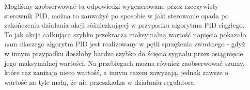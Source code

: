 \documentclass[a4paper, 12pt]{article}
\begin{document}
		\newline
		\newline
		Mogliśmy zaobserwować tu odpowiedzi wygenerowane przez rzeczywisty sterownik PID, można to zauważyć po sposobie w jaki sterowanie opada po zakończeniu działania akcji różniczkującej w przypadku algorytmu PID ciągłego. To jak akcja całkująca szybko przekracza maksymalną wartość napięcia pokazało nam dlaczego algorytm PID jest realizowany w pętli sprzężenia zwrotnego - gdyż w innym przypadku doszłoby bardzo szybko do ścięcia sygnału przez osiągnięcie jego maksymalnej wartości. Na przebiegach można również zaobserwować szumy, które raz zaniżają nieco wartość, a innym razem zawyżają, jednak zawsze o wartość na tyle małą, że nie przeszkadza w działaniu regulatora.
\end{document}
